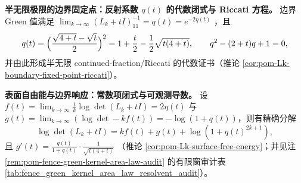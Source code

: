     \item \textbf{半无限极限的边界固定点：反射系数 \texorpdfstring{\(q(t)\)}{q(t)} 的代数闭式与 Riccati 方程。}
    边界 Green 值满足
    \(
    \lim_{k\to\infty}(L_k+tI)^{-1}_{11}=q(t)=e^{-2\eta(t)}
    \)
    ，且
    \[
    q(t)=\Bigl(\frac{\sqrt{4+t}-\sqrt{t}}{2}\Bigr)^2
    =1+\frac{t}{2}-\frac12\sqrt{t(4+t)},
    \qquad
    q^2-(2+t)q+1=0,
    \]
    并由此形成半无限 continued-fraction/Riccati 的代数证书（推论 \ref{cor:pom-Lk-boundary-fixed-point-riccati}）。

    \item \textbf{表面自由能与边界响应：常数项闭式与可观测导数。}
    设
    \(f(t)=\lim_{k\to\infty}\frac1k\log\det(L_k+tI)=2\eta(t)\)
    与
    \(g(t)=\lim_{k\to\infty}(\log\det-k f(t))=-\log(1+q(t))\)，则有精确分解
    \[
    \log\det(L_k+tI)=k f(t)+g(t)+\log(1+q(t)^{2k+1}),
    \]
    且
    \(
    g'(t)=\frac{q(t)}{1+q(t)}\cdot \frac{1}{\sqrt{t(4+t)}}
    \)
    （推论 \ref{cor:pom-Lk-surface-free-energy}；并见注 \ref{rem:pom-fence-green-kernel-area-law-audit} 的有限窗审计表 \ref{tab:fence_green_kernel_area_law_resolvent_audit}）。

